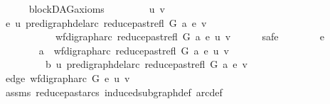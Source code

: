 \begin{isabellebody}
\ \ \ \ \isamarkupfalse%
\ blockDAG{\isacharunderscore}{\kern0pt}axioms\isanewline
\ \ \isamarkupfalse%
\isanewline
\ \ \ \ \isamarkupfalse%
\ u\ v\ \isanewline
\ \ \ \ \isamarkupfalse%
\ {\isachardoublequoteopen}{\isasymforall}e{\isachardot}{\kern0pt}\ u\ {\isasymrightarrow}\isactrlsup {\isacharplus}{\kern0pt}\isactrlbsub pre{\isacharunderscore}{\kern0pt}digraph{\isachardot}{\kern0pt}del{\isacharunderscore}{\kern0pt}arc\ {\isacharparenleft}{\kern0pt}reduce{\isacharunderscore}{\kern0pt}past{\isacharunderscore}{\kern0pt}refl\ G\ a{\isacharparenright}{\kern0pt}\ e\isactrlesub \ v\isanewline
\ \ \ \ \ \ \ \ \ {\isasymlongrightarrow}\ {\isasymnot}\ wf{\isacharunderscore}{\kern0pt}digraph{\isachardot}{\kern0pt}arc\ {\isacharparenleft}{\kern0pt}reduce{\isacharunderscore}{\kern0pt}past{\isacharunderscore}{\kern0pt}refl\ G\ a{\isacharparenright}{\kern0pt}\ e\ {\isacharparenleft}{\kern0pt}u{\isacharcomma}{\kern0pt}\ v{\isacharparenright}{\kern0pt}{\isachardoublequoteclose}\isanewline
\ \ \ \ \isamarkupfalse%
\ safe\isanewline
\ \ \ \ \ \ \isamarkupfalse%
\ e\ \isanewline
\ \ \ \ \ \ \isamarkupfalse%
\ a{\isacharcolon}{\kern0pt}\ {\isachardoublequoteopen}\ wf{\isacharunderscore}{\kern0pt}digraph{\isachardot}{\kern0pt}arc\ {\isacharparenleft}{\kern0pt}reduce{\isacharunderscore}{\kern0pt}past{\isacharunderscore}{\kern0pt}refl\ G\ a{\isacharparenright}{\kern0pt}\ e\ {\isacharparenleft}{\kern0pt}u{\isacharcomma}{\kern0pt}\ v{\isacharparenright}{\kern0pt}{\isachardoublequoteclose}\isanewline
\ \ \ \ \ \ \ \ \ b{\isacharcolon}{\kern0pt}\ {\isachardoublequoteopen}u\ {\isasymrightarrow}\isactrlsup {\isacharplus}{\kern0pt}\isactrlbsub pre{\isacharunderscore}{\kern0pt}digraph{\isachardot}{\kern0pt}del{\isacharunderscore}{\kern0pt}arc\ {\isacharparenleft}{\kern0pt}reduce{\isacharunderscore}{\kern0pt}past{\isacharunderscore}{\kern0pt}refl\ G\ a{\isacharparenright}{\kern0pt}\ e\isactrlesub \ v{\isachardoublequoteclose}\isanewline
\ \ \ \ \ \ \isamarkupfalse%
\ edge{\isacharcolon}{\kern0pt}\ {\isachardoublequoteopen}wf{\isacharunderscore}{\kern0pt}digraph{\isachardot}{\kern0pt}arc\ G\ e\ {\isacharparenleft}{\kern0pt}u{\isacharcomma}{\kern0pt}\ v{\isacharparenright}{\kern0pt}{\isachardoublequoteclose}\isanewline
\ \ \ \ \ \ \ \ \isamarkupfalse%
\ assms\ reduce{\isacharunderscore}{\kern0pt}past{\isacharunderscore}{\kern0pt}arcs{}\ induced{\isacharunderscore}{\kern0pt}subgraph{\isacharunderscore}{\kern0pt}def\ arc{\isacharunderscore}{\kern0pt}def\ \isanewline

\end{isabellebody}
